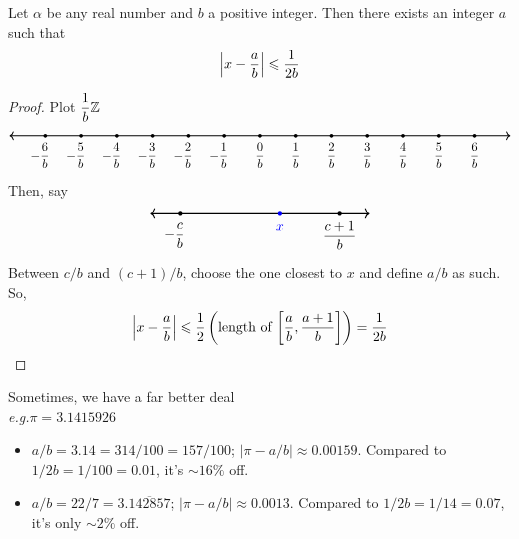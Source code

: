 \begin{proposition}
Let $\alpha$ be any real number and $b$ a positive integer. Then there exists an integer $a$ such that 
\[\left\lvert x - \frac{a}{b}\right\rvert \leqslant \frac{1}{2b}\]
\end{proposition}
\begin{proof}
Plot $\dfrac{1}{b}\mathbb Z$
\[\begin{tikzpicture}
    \draw[<->,thick] (-7,0)--(7,0);
	\foreach \x in {-6,-5,-4,-3,-2,-1,0,1,2,3,4,5,6}
    {
    \fill (\x,0) circle (1.5pt);
    }
    \node[] at (0,-0.55) {$\dfrac{0}{b}$};
    \node[] at (1,-0.55) {$\dfrac{1}{b}$};
    \node[] at (2,-0.55) {$\dfrac{2}{b}$};
    \node[] at (3,-0.55) {$\dfrac{3}{b}$};
    \node[] at (4,-0.55) {$\dfrac{4}{b}$};
    \node[] at (5,-0.55) {$\dfrac{5}{b}$};
    \node[] at (6,-0.55) {$\dfrac{6}{b}$};
    \node[] at (-1.15,-0.55) {$-\dfrac{1}{b}$};
    \node[] at (-2.15,-0.55) {$-\dfrac{2}{b}$};
    \node[] at (-3.15,-0.55) {$-\dfrac{3}{b}$};
    \node[] at (-4.15,-0.55) {$-\dfrac{4}{b}$};
    \node[] at (-5.15,-0.55) {$-\dfrac{5}{b}$};
    \node[] at (-6.15,-0.55) {$-\dfrac{6}{b}$};
\end{tikzpicture}\]
Then, say
\[\begin{tikzpicture}
    \draw[<->,thick] (-2.75,0)--(2.75,0);
	\foreach \x in {-2,2}
    {
    \fill (\x,0) circle (1.5pt);
    }
    \node[] at (2,-0.55) {$\dfrac{c+1}{b}$};
    \node[] at (-2.15,-0.55) {$-\dfrac{c}{b}$};
    \node[color=blue] at (0.5,-0.35) {$x$};
    \fill[color=blue] (0.5,0) circle (1.5pt);
\end{tikzpicture}\]
Between $c/b$ and $(c+1)/b$, choose the one closest to $x$ and define $a/b$ as such. So, 
\[\left\lvert x - \frac{a}{b}\right\rvert \leqslant \frac{1}{2}\left(\text{length of $\left[\frac{a}{b},\frac{a+1}{b}\right]$}\right) = \frac{1}{2b}\]
\end{proof}
\vspace*{1em}
Sometimes, we have a far better deal\\[0.2em]
\emph{e.g.}\quad $\pi = 3.1415926$
\begin{itemize}
\item $a/b = 3.14 = 314/100 = 157/100$; $|\pi - a/b| \approx 0.00159$. Compared to $1/2b = 1/100 = 0.01$, it's $\sim 16\%$ off.
\item $a/b = 22/7 = 3.\overline{142857}$; $|\pi - a/b| \approx 0.0013$. Compared to $1/2b = 1/14 = 0.07$, it's only $\sim 2\%$ off.
\end{itemize}

